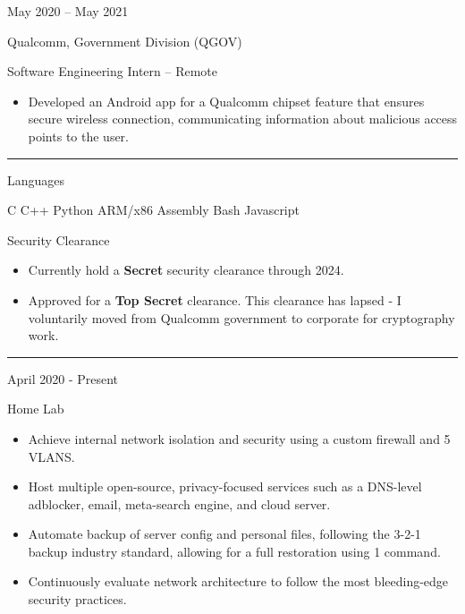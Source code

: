 \documentclass[a4paper]{article}
\newlength{\cvcolumngapwidth}
\newlength{\cvleftcolumnwidth}
\newlength{\cvrightcolumnwidth}
\newcommand{\cvsectionstyle}[1]{{\normalsize\cvsectionfont\textcolor{cvsectioncolor}{#1}}}
\newcommand{\cvtitlestyle}[1]{{\large\cvtitlefont\textcolor{cvtitlecolor}{#1}}}
\newcommand{\cvdurationstyle}[1]{{\small\cvdurationfont\textcolor{cvdurationcolor}{#1}}}
\newcommand{\cvheadingstyle}[1]{{\normalsize\cvheadingfont\textcolor{cvheadingcolor}{#1}}}
\newcommand{\italicstyle}[1]{{\small\italicfont\textcolor{cvsectioncolor}{#1}}}
\newlength{\cvafteritemskipamount}
\newlength{\cvaftersectionskipamount}
\newlength{\cvaftertitleskipamount}
\newlength{\cvparskip}
\newcommand{\cvsection}[1]{
    \begin{minipage}[t]{\cvleftcolumnwidth}
        \raggedleft\cvsectionstyle{#1}
    \end{minipage}%
    \hspace{\cvcolumngapwidth}%
    \begin{minipage}[t]{\cvrightcolumnwidth}
        \textcolor{cvrulecolor}{\rule{\cvrightcolumnwidth}{0.3mm}}
    \end{minipage}

    \vspace{\cvaftersectionskipamount}
}
\newcommand{\cvitem}[2]{
    \begin{minipage}[t]{\cvleftcolumnwidth}
        \raggedleft #1
    \end{minipage}%
    \hspace{\cvcolumngapwidth}%
    \begin{minipage}[t]{\cvrightcolumnwidth}
        \setlength{\parskip}{\cvparskip} #2
    \end{minipage}

    \vspace{\cvafteritemskipamount}
}
\newcommand{\cvtitle}[1]{
    \cvtitlestyle{#1}

    \vspace{\cvaftertitleskipamount}
    \vspace{-\cvparskip}
}
\begin{document}
\cvitem{
    \cvdurationstyle{May 2020 -- May 2021}
}{
    \cvtitle{Qualcomm, Government Division (QGOV)}

    \italicstyle{Software Engineering Intern  --  Remote}

    \normalsize
    \begin{itemize}[leftmargin=*]
        \item Developed an Android app for a Qualcomm chipset feature that ensures secure wireless connection,
          communicating information about malicious access points to the user.
    \end{itemize}
}


\cvsection{\LARGE \textcolor{emphasiscolor}{EXPERTISE}}

\cvitem{
    \cvheadingstyle{Languages}
}{
  C \hspace{12mm} C++ \hspace{12mm} Python \hspace{12mm} ARM/x86 Assembly \hspace{12mm} Bash \hspace{12mm} Javascript
  \vspace{1mm}
}

\cvitem{
    \cvheadingstyle{Security Clearance}
}{
    \begin{itemize}[leftmargin=*]
      \item Currently hold a \textbf{Secret} security clearance through 2024.
      \item Approved for a \textbf{Top Secret} clearance. This clearance has lapsed - I voluntarily moved from Qualcomm government to corporate for cryptography work.
    \end{itemize}
  \vspace{1.5mm}
}


\cvsection{\LARGE \textcolor{emphasiscolor}{PERSONAL PROJECTS}}

\cvitem{
    \cvdurationstyle{April 2020 - Present}
}{
  \cvtitle{Home Lab}

    \begin{itemize}[leftmargin=*]
        \item Achieve internal network isolation and security using a custom firewall and 5 VLANS.
        \item Host multiple open-source, privacy-focused services such as a DNS-level adblocker, email, meta-search engine, and cloud server.
        \item Automate backup of server config and personal files, following the 3-2-1 backup industry standard, allowing for a full restoration using 1 command.
        \item Continuously evaluate network architecture to follow the most bleeding-edge security practices.
    \end{itemize}
}
\end{document}
